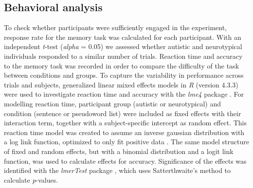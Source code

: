\subsection*{Behavioral analysis}
To check whether participants were sufficiently engaged in the experiment, response rate for the memory task was calculated for each participant. With an independent \textit{t}-test (\textit{alpha} = 0.05) we assessed whether autistic and neurotypical individuals responded to a similar number of trials. Reaction time and accuracy to the memory task was recorded in order to compare the difficulty of the task between conditions and groups. To capture the variability in performance across trials and subjects, generalized linear mixed effects models in \textit{R} (version 4.3.3) were used to investigate reaction time and accuracy with the \textit{lme4} package \citep{bates2015}. For modelling reaction time, participant group (autistic or neurotypical) and condition (sentence or pseudoword list) were included as fixed effects with their interaction term, together with a subject-specific intercept as random effect. This reaction time model was created to assume an inverse gaussian distribution with a log link function, optimized to only fit positive data \citep{lo2015}. The same model structure of fixed and random effects, but with a binomial distribution and a logit link function, was used to calculate effects for accuracy. Significance of the effects was identified with the \textit{lmerTest} package \citep{kuznetsova2017}, which uses Satterthwaite's method to calculate \textit{p}-values. 

